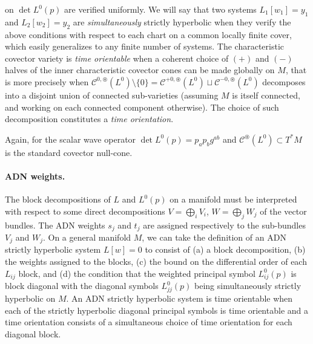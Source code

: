 \documentclass[a4paper]{article}
\theoremstyle{remark}
\newcommand{\oast}{\circledast} %
\begin{document}
on $\det L^0(p)$ are verified uniformly. We will say that two systems $L_1[w_1]
= y_1$ and $L_2[w_2] = y_2$ are \emph{simultaneously} strictly hyperbolic when
they verify the above conditions with respect to each chart on a common locally
finite cover, which easily generalizes to any finite number of systems. The
characteristic covector variety is \emph{time orientable} when a coherent
choice of $(+)$ and $(-)$ halves of the inner characteristic covector cones can
be made globally on $M$, that is more precisely when
$\mathcal{C}^{0,\oast}(L^0) \setminus \{0\} = \mathcal{C}^{+0,\oast}(L^0)
\sqcup \mathcal{C}^{-0,\oast}(L^0)$ decomposes into a disjoint union of
connected sub-varieties (assuming $M$ is itself connected, and working on each
connected component otherwise). The choice of such decomposition constitutes a
\emph{time orientation}.

Again, for the scalar wave operator $\det L^0(p) = p_a p_b g^{ab}$ and
$\mathcal{C}^\oast(L^0) \subset T^*M$ is the standard covector null-cone.

\paragraph{ADN weights.}
The block decompositions of $L$ and $L^0(p)$ on a manifold must be interpreted
with respect to some direct decompositions $V = \bigoplus_i V_i$, $W =
\bigoplus_j W_j$ of the vector bundles. The ADN weights $s_j$ and $t_j$ are
assigned respectively to the sub-bundles $V_j$ and $W_j$. On a general manifold
$M$, we can take the definition of an ADN strictly hyperbolic system $L[w] = 0$
to consist of (a) a block decomposition, (b) the weights assigned to the
blocks, (c) the bound on the differential order of each $L_{ij}$ block, and (d)
the condition that the weighted principal symbol $L^0_{ij}(p)$ is block
diagonal with the diagonal symbols $L^0_{jj}(p)$ being simultaneously strictly
hyperbolic on $M$. An ADN strictly hyperbolic system is time orientable when
each of the strictly hyperbolic diagonal principal symbols is time orientable
and a time orientation consists of a simultaneous choice of time orientation
for each diagonal block.
\end{document}
